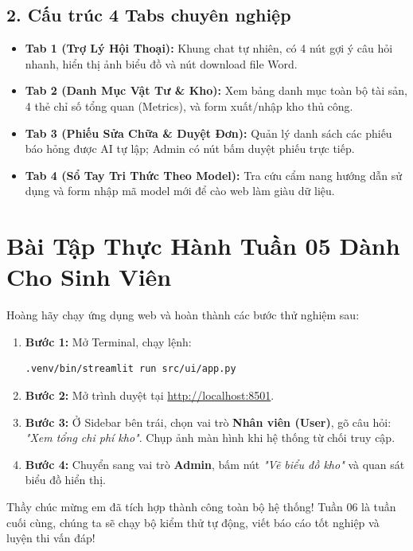 \documentclass[11pt,a4paper]{article}
\begin{document}
\subsection{2. Cấu trúc 4 Tabs chuyên nghiệp}
\begin{itemize}
    \item \textbf{Tab 1 (Trợ Lý Hội Thoại):} Khung chat tự nhiên, có 4 nút gợi ý câu hỏi nhanh, hiển thị ảnh biểu đồ và nút download file Word.
    \item \textbf{Tab 2 (Danh Mục Vật Tư \& Kho):} Xem bảng danh mục toàn bộ tài sản, 4 thẻ chỉ số tổng quan (Metrics), và form xuất/nhập kho thủ công.
    \item \textbf{Tab 3 (Phiếu Sửa Chữa \& Duyệt Đơn):} Quản lý danh sách các phiếu báo hỏng được AI tự lập; Admin có nút bấm duyệt phiếu trực tiếp.
    \item \textbf{Tab 4 (Sổ Tay Tri Thức Theo Model):} Tra cứu cẩm nang hướng dẫn sử dụng và form nhập mã model mới để cào web làm giàu dữ liệu.
\end{itemize}

\section{Bài Tập Thực Hành Tuần 05 Dành Cho Sinh Viên}

Hoàng hãy chạy ứng dụng web và hoàn thành các bước thử nghiệm sau:

\begin{enumerate}
    \item \textbf{Bước 1:} Mở Terminal, chạy lệnh:
\begin{lstlisting}[language=bash]
.venv/bin/streamlit run src/ui/app.py
\end{lstlisting}
    \item \textbf{Bước 2:} Mở trình duyệt tại \url{http://localhost:8501}.
    \item \textbf{Bước 3:} Ở Sidebar bên trái, chọn vai trò \textbf{Nhân viên (User)}, gõ câu hỏi: \textit{"Xem tổng chi phí kho"}. Chụp ảnh màn hình khi hệ thống từ chối truy cập.
    \item \textbf{Bước 4:} Chuyển sang vai trò \textbf{Admin}, bấm nút \textit{"Vẽ biểu đồ kho"} và quan sát biểu đồ hiển thị.
\end{enumerate}

Thầy chúc mừng em đã tích hợp thành công toàn bộ hệ thống! Tuần 06 là tuần cuối cùng, chúng ta sẽ chạy bộ kiểm thử tự động, viết báo cáo tốt nghiệp và luyện thi vấn đáp!
\end{document}
